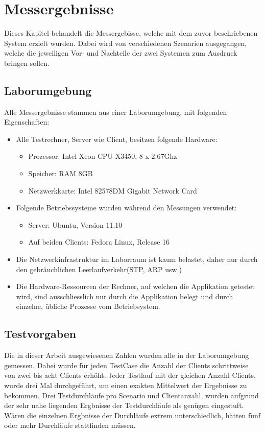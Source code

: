 \chapter{Messergebnisse}

Dieses Kapitel behandelt die Messergebisse, welche mit dem zuvor beschriebenen System erzielt wurden. Dabei wird von verschiedenen Szenarien ausgegangen, welche die jeweiligen Vor- und Nachteile der zwei Systemen zum Ausdruck bringen sollen. \newline

\section{Laborumgebung}

Alle Messergebnisse stammen aus einer Laborumgebung, mit folgenden Eigenschaften:
\begin{itemize}
\item Alle Testrechner, Server wie Client, besitzen folgende Hardware:
\begin{itemize}
\item Prozessor: Intel Xeon CPU X3450, 8 x 2.67Ghz
\item Speicher: RAM 8GB
\item Netzwerkkarte: Intel 82578DM Gigabit Network Card
\end{itemize}
\item Folgende Betriebssysteme wurden während den Messungen verwendet:
\begin{itemize}
\item Server: Ubuntu, Version 11.10
\item Auf beiden Clients: Fedora Linux, Release 16
\end{itemize}
\item Die Netzwerkinfrastruktur im Laborraum ist kaum belastet, daher nur durch den gebräuchlichen Leerlaufverkehr(STP, ARP usw.)
\item Die Hardware-Ressourcen der Rechner, auf welchen die Applikation getestet wird, sind ausschliesslich nur durch die Applikation belegt und durch einzelne, übliche Prozesse vom  Betriebsystem.
\end{itemize}

\section{Testvorgaben}
Die in dieser Arbeit ausgewiesenen Zahlen wurden alle in der Laborumgebung gemessen. Dabei wurde für jeden TestCase die Anzahl der Clients schrittweise von zwei bis acht Clients erhöht. Jeder Testlauf mit der gleichen Anzahl Clients, wurde drei Mal durchgeführt, um einen exakten Mittelwert der Ergebnisse zu bekommen. Drei Testdurchläufe pro Scenario und Clientanzahl, wurden aufgrund der sehr nahe liegenden Ergbnisse der Testdurchläufe als genügen eingestuft. Wären die einzelnen Ergbnisse der Durchläufe extrem unterschiedlich, hätten fünf oder mehr Durchläufe stattfinden müssen.

